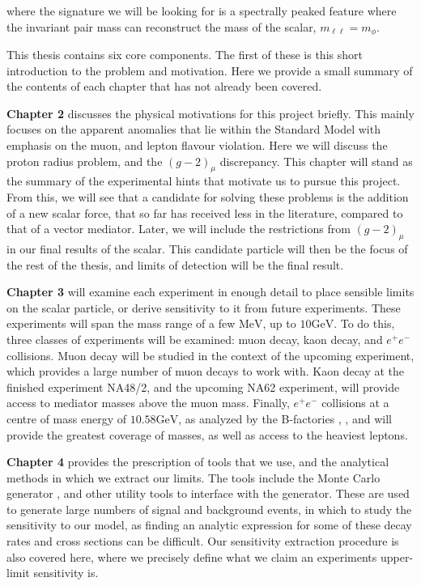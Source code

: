 \noindent where the signature we will be looking for is a spectrally peaked feature where the invariant pair mass can reconstruct the mass of the scalar, $m_{\ell\ell} = m_\phi$.

This thesis contains six core components.
The first of these is this short introduction to the problem and motivation.
Here we provide a small summary of the contents of each chapter that has not already been covered.

\textbf{Chapter 2} discusses the physical motivations for this project briefly.
This mainly focuses on the apparent anomalies that lie within the Standard Model with emphasis on the muon, and lepton flavour violation.
Here we will discuss the proton radius problem, and the $(g-2)_\mu$ discrepancy.
This chapter will stand as the summary of the experimental hints that motivate us to pursue this project.
From this, we will see that a candidate for solving these problems is the addition of a new scalar force, that so far has received less in the literature, compared to that of a vector mediator.
Later, we will include the restrictions from $(g-2)_\mu$ in our final results of the scalar.
This candidate particle will then be the focus of the rest of the thesis, and limits of detection will be the final result.

\textbf{Chapter 3} will examine each experiment in enough detail to place sensible limits on the scalar particle, or derive sensitivity to it from future experiments.
These experiments will span the mass range of a few $\textrm{MeV}$, up to $10\textrm{GeV}$.
To do this, three classes of experiments will be examined: muon decay, kaon decay, and $e^+ e^-$ collisions.
Muon decay will be studied in the context of the upcoming \mueee experiment, which provides a large number of muon decays to work with.
Kaon decay at the finished experiment NA48/2, and the upcoming NA62 experiment, will provide access to mediator masses above the muon mass.
Finally, $e^+ e^-$ collisions at a centre of mass energy of $10.58\textrm{GeV}$, as analyzed by the B-factories \babar, \belle, and \belletwo will provide the greatest coverage of masses, as well as access to the heaviest leptons.

\textbf{Chapter 4} provides the prescription of tools that we use, and the analytical methods in which we extract our limits.
The tools include the Monte Carlo generator \madgraph, and other utility tools to interface with the generator.
These are used to generate large numbers of signal and background events, in which to study the sensitivity to our model, as finding an analytic expression for some of these decay rates and cross sections can be difficult.
Our sensitivity extraction procedure is also covered here, where we precisely define what we claim an experiments upper-limit sensitivity is.

